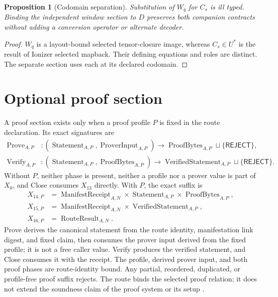 \documentclass[11pt,letterpaper]{article}
\newcommand{\Reject}{\mathsf{REJECT}}
\newtheorem{proposition}[theorem]{Proposition}
\theoremstyle{definition}
\begin{document}
\begin{proposition}[Codomain separation]
Substitution of $W_q$ for $C_s$ is ill typed.  Binding the independent window
section to $D$ preserves both companion contracts without adding a conversion
operator or alternate decoder.
\end{proposition}
\begin{proof}
$W_q$ is a layout-bound selected tensor-closure image, whereas $C_s\in U^*$ is
the result of Ionizer selected mapback.  Their defining equations and roles
are distinct.  The separate section uses each at its declared codomain.
\end{proof}

\section{Optional proof section}

A proof section exists only when a proof profile $P$ is fixed in the route
declaration.  Its exact signatures are
\begin{align}
\operatorname{Prove}_{A,P}&:
 (\operatorname{Statement}_{A,P},\operatorname{ProverInput}_{A,P})
 \to\operatorname{ProofBytes}_{A,P}\sqcup\{\Reject\},\\
\operatorname{Verify}_{A,P}&:
 (\operatorname{Statement}_{A,P},\operatorname{ProofBytes}_{A,P})
 \to\operatorname{VerifiedStatement}_{A,P}\sqcup\{\Reject\}.
\end{align}
Without $P$, neither phase is present, neither a profile nor a prover value is
part of $X_0$, and Close consumes $X_{13}$ directly.
With $P$, the exact suffix is
\begin{align*}
X_{14,P}&=\operatorname{ManifestReceipt}_{A,N}\times
 \operatorname{Statement}_{A,P}\times\operatorname{ProofBytes}_{A,P},\\
X_{15,P}&=\operatorname{ManifestReceipt}_{A,N}\times
 \operatorname{VerifiedStatement}_{A,P},\\
X_{16,P}&=\operatorname{RouteResult}_{A,N}.
\end{align*}
Prove derives the canonical statement from the route identity, manifestation
link digest, and fixed claim, then consumes the prover input derived from the
fixed profile; it is not a free caller value.
Verify produces the verified statement, and Close consumes it with the receipt.
The profile, derived prover input, and both proof phases are route-identity
bound.  Any partial, reordered, duplicated, or profile-free proof suffix
rejects.
The route binds the selected proof relation; it does not extend the soundness
claim of the proof system or its setup \cite{groth2016}.
\end{document}

